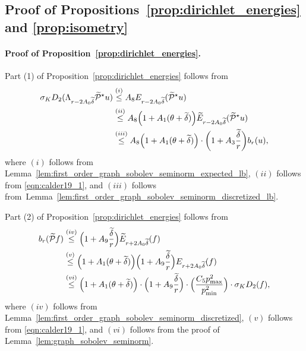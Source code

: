 \documentclass[twoside]{article}
\newcommand{\1}{\mathbf{1}}
\newcommand{\mc}[1]{\mathcal{#1}}
\newcommand{\wt}[1]{\widetilde{#1}}
\theoremstyle{definition}
\theoremstyle{remark}
\begin{document}
\subsection{Proof of Propositions~\ref{prop:dirichlet_energies} and \ref{prop:isometry}}
\label{subsec:proof_of_prop_dirichlet_energies_and_isometry}

\paragraph{Proof of Proposition~\ref{prop:dirichlet_energies}.}
Part (1) of Proposition~\ref{prop:dirichlet_energies} follows from
\begin{align*}
\sigma_K D_2(\Lambda_{r - 2A_0\wt{\delta}} \wt{\mc{P}}^{\star}u) & \overset{(i)}{\leq} A_8 E_{r - 2A_0\wt{\delta}}(\wt{\mc{P}}^{\star}u) \\
& \overset{(ii)}{\leq} A_8 \Bigl(1 + A_1(\theta + \wt{\delta})\Bigr) \wt{E}_{r - 2A_0\wt{\delta}}(\wt{\mc{P}}^{\star}u) \\
& \overset{(iii)}{\leq} A_8 \Bigl(1 + A_1(\theta + \wt{\delta})\Bigr) \cdot \biggl(1 + A_3\frac{\wt{\delta}}{r}\biggr) b_r(u),
\end{align*}
where $(i)$ follows from Lemma~\ref{lem:first_order_graph_sobolev_seminorm_expected_lb}, $(ii)$ follows from \eqref{eqn:calder19_1}, and $(iii)$ follows from~Lemma~\ref{lem:first_order_graph_sobolev_seminorm_discretized_lb}.

Part (2) of Proposition~\ref{prop:dirichlet_energies} follows from
\begin{align*}
b_r(\wt{\mc{P}}f) & \overset{(iv)}{\leq} \Bigl(1 + A_9\frac{\wt{\delta}}{r}\Bigr)\wt{E}_{r + 2A_0\wt{\delta}}(f)\\
& \overset{(v)}{\leq} \Bigl(1 + A_1(\theta + \wt{\delta})\Bigr) \Bigl(1 + A_9\frac{\wt{\delta}}{r}\Bigr){E}_{r + 2A_0\wt{\delta}}(f) \\
& \overset{(vi)}{\leq} \Bigl(1 + A_1(\theta + \wt{\delta})\Bigr) \cdot \Bigl(1 + A_9\frac{\wt{\delta}}{r}\Bigr) \cdot \Bigl(\frac{C_5 p_{\max}^2}{p_{\min}^2}\Bigr) \cdot \sigma_{K} D_2(f),
\end{align*}
where $(iv)$ follows from Lemma~\ref{lem:first_order_graph_sobolev_seminorm_discretized}, $(v)$ follows from \eqref{eqn:calder19_1}, and $(vi)$ follows from the proof of Lemma~\ref{lem:graph_sobolev_seminorm}.
\end{document}
